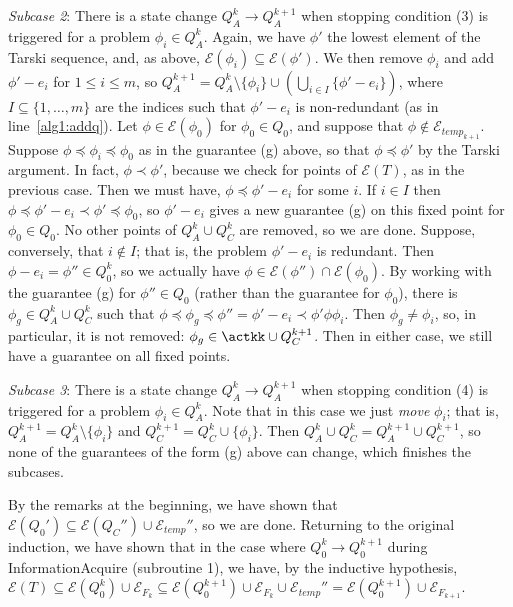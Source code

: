 \documentclass[11pt,reqno]{amsart}
\theoremstyle{definition}
\numberwithin{equation}{section}
\newcommand{\pre}{\phi}
\newcommand{\sub}{\subseteq}
\newcommand{\fix}{\mathcal{E}}
\newcommand{\peq}{\preceq}
\newcommand{\pe}{\prec}
\newcommand{\acto}{Q_0}
\newcommand{\actok}{Q_0^k}
\newcommand{\actokk}{Q_0^{k+1}}
\newcommand{\actak}{Q_A^k}
\newcommand{\actak}{Q_A^{k}}
\newcommand{\actakk}{Q_A^{k + 1}}
\newcommand{\actc}{Q_C}
\newcommand{\actck}{Q_C^k}
\newcommand{\actckk}{Q_C^{k + 1}}
\newcommand{\pren}{\pre_{0}}
\newcommand{\fixfind}{\mathcal{E}_F}
\newcommand{\fixtemp}{\mathcal{E}_{temp}}
\begin{document}
\begin{enumerate}
\emph{Subcase 2}: There is a state change $\actak \to \actakk$ when stopping condition (3) is triggered for a problem $\pre_i \in \actak$.
Again, we have $\pre'$ the lowest element of the Tarski sequence, and, as above, $\fix(\pre_i) \sub \fix(\pre')$.
We then remove $\pre_i$ and add $\pre' - e_i$ for $1 \leq i \leq m$, so $\actakk = \actak \setminus \{\pre_i \} \cup \left (\bigcup_{i \in I} \{\pre' - e_i \} \right )$, where $I \sub \{1,\hdots,m\}$ are the indices such that $\pre' - e_i$ is non-redundant (as in line~\ref{alg1:addq}).
Let $\pre \in \fix(\pren)$ for $\pren \in \acto$, and suppose that $\pre \not \in \fixtemp_{k +1}$.
Suppose $\pre \peq \pre_i \peq \pren$ as in the guarantee (g) above, so that $\pre \peq \pre'$ by the Tarski argument.
In fact, $\pre \pe \pre'$, because we check for points of $\fix(T)$, as in the previous case.
Then we must have, $\pre \peq \pre' - e_i$ for some $i$.
If $i \in I$ then $\pre \peq \pre' - e_i \pe \pre' \peq \pren$, so $\pre' - e_i$ gives a new guarantee (g) on this fixed point for $\pren \in \acto$.
No other points of $\actak \cup \actck$ are removed, so we are done.
Suppose, conversely, that $i \not \in I$; that is, the problem $\pre' - e_i$ is redundant.
Then $\pre - e_i = \pre'' \in \actok$, so we actually have $\pre \in \fix(\pre'') \cap \fix(\pren)$.
By working with the guarantee (g) for $\pre'' \in \acto$ (rather than the guarantee for $\pren$), there is $\pre_g \in \actak \cup \actck$ such that $\pre \peq \pre_g \peq \pre'' = \pre' - e_i \pe \pre' \pre \pre_i$.
Then $\pre_g \not = \pre_i$, so, in particular, it is not removed: $\pre_g \in \actkk \cup \actckk$.
Then in either case, we still have a guarantee on all fixed points.

\emph{Subcase 3}: There is a state change $\actak \to \actakk$ when stopping condition (4) is triggered for a problem $\pre_i \in \actak$.
Note that in this case we just \emph{move} $\pre_i$; that is, $\actakk = \actak \setminus \{\pre_i\}$ and $\actckk = \actck \cup \{\pre_i\}$.
Then $\actak \cup \actck = \actakk \cup \actckk$, so none of the guarantees of the form (g) above can change, which finishes the subcases.

By the remarks at the beginning, we have shown that $\fix(\acto') \sub \fix(\actc'') \cup \fixtemp''$, so we are done.
Returning to the original induction, we have shown that in the case where $\actok \to \actokk$ during InformationAcquire (subroutine 1), we have, by the inductive hypothesis, $\fix(T) \sub \fix(\actok) \cup \fixfind_k \sub \fix(\actokk) \cup \fixfind_k \cup \fixtemp'' = \fix(\actokk) \cup \fixfind_{k + 1}$.


\end{enumerate}
\end{document}
